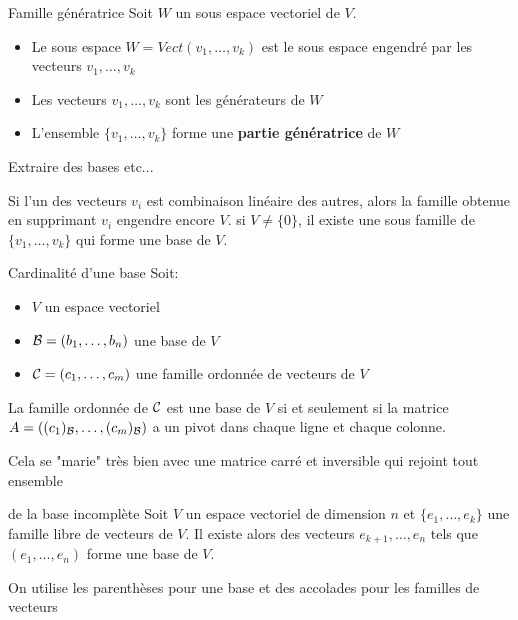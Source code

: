 \begin{parag}{Famille génératrice}
    Soit $W$ un sous espace vectoriel de $V$.
    \begin{itemize}
        \item Le sous espace $W = Vect(v_1, \dots, v_k)$ est le sous espace engendré par les vecteurs $v_1, \dots, v_k$
        \item Les vecteurs $v_1, \dots, v_k$ sont les générateurs de $W$
        \item L'ensemble $\{v_1, \dots, v_k\}$ forme une \textbf{partie génératrice} de $W$
    \end{itemize}
    \begin{subparag}{Extraire des bases etc...}
        \begin{theoreme}
            Si l'un des vecteurs $v_i$ est combinaison linéaire des autres, alors la famille obtenue en supprimant $v_i$ engendre encore $V$.
            si $V \neq \{0\}$, il existe une sous famille de $\{v_1, \dots, v_k\}$ qui forme une base de $V$.
        \end{theoreme}
    \end{subparag}
    \begin{subparag}{Cardinalité d'une base}
    Soit:
    \begin{itemize}
        \item $V$ un espace vectoriel
        \item $\mathcal{B} = (b_1, \dots, b_n)$ une base de $V$
        \item $\mathcal{C} = (c_1, \dots, c_m)$ une famille ordonnée de vecteurs de $V$
    \end{itemize}
    \begin{theoreme}
        La famille ordonnée de $\mathcal{C}$ est une base de $V$ si et seulement si la matrice $A = ((c_1)_{\mathcal{B}}, \dots, (c_m)_{\mathcal{B}})$ a un pivot dans chaque ligne et chaque colonne.
    \end{theoreme}
    \begin{framedremark}
        Cela se "marie" très bien avec une matrice carré et inversible qui rejoint tout ensemble
    \end{framedremark}
        
    \end{subparag}
    \begin{theoreme}{de la base incomplète}
        Soit $V$ un espace vectoriel de dimension $n$ et $\{e_1, \dots, e_k\}$ une famille libre de vecteurs de $V$. Il existe alors des vecteurs $e_{k+1}, \dots, e_n$ tels que $(e_1, \dots, e_n)$ forme une base de $V$.
    \end{theoreme}
    \begin{truc}
        On utilise les parenthèses pour une base et des accolades pour les familles de vecteurs
    \end{truc}
\end{parag}
